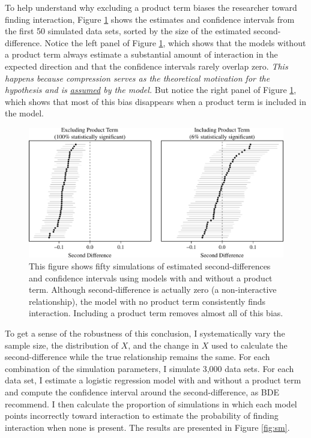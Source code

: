 \documentclass[12pt]{article}
\begin{document}
To help understand why excluding a product term biases the researcher toward finding interaction, Figure \ref{fig:plotted_cis} shows the estimates and confidence intervals from the first 50 simulated data sets, sorted by the size of the estimated second-difference. Notice the left panel of Figure \ref{fig:plotted_cis}, which shows that the models without a product term always estimate a substantial amount of interaction in the expected direction  and that the confidence intervals rarely overlap zero. \textit{This happens because compression serves as the theoretical motivation for the hypothesis and is \underline{assumed} by the model.} But notice the right panel of Figure \ref{fig:plotted_cis}, which shows that most of this bias disappears when a product term is included in the model.

\begin{figure}[h]
\begin{center}
\includegraphics[scale=.7]{fig/fig_plotted_cis.pdf}
\end{center}
\caption{This figure shows fifty simulations of estimated second-differences and confidence intervals using models with and without a product term. Although second-difference is actually zero (a non-interactive relationship), the model with no product term consistently finds interaction. Including a product term removes almost all of this bias.}\label{fig:plotted_cis}
\end{figure}

To get a sense of the robustness of this conclusion, I systematically vary the sample size, the distribution of $X$, and the change in $X$ used to calculate the second-difference while the true relationship remains the same. For each combination of the simulation parameters, I simulate 3,000 data sets. For each data set, I estimate a logistic regression model with and without a product term and compute the confidence interval around the second-difference, as BDE recommend. I then calculate the proportion of simulations in which each model points incorrectly toward interaction to estimate the probability of finding interaction when none is present. The results are presented in Figure \ref{fig:sm}.
\end{document}

